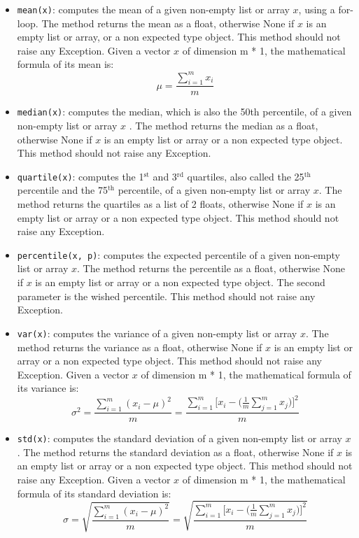 \documentclass{42-en}
\begin{document}
\begin{itemize}
  \item \texttt{mean(x)}: computes the mean of a given non-empty list or array $x$, using a for-loop.
        The method returns the mean as a float, otherwise None if $x$ is an empty list or array,
        or a non expected type object.
        This method should not raise any Exception.
        \newline
        Given a vector $x$ of dimension m * 1, the mathematical formula of its mean is:
        $$
        \mu = \frac{\sum_{i = 1}^{m}{x_i}}{m}
        $$

  \item \texttt{median(x)}: computes the median, which is also the 50th percentile, of a given non-empty list or array $x$ .
        The method returns the median as a float,
        otherwise None if $x$ is an empty list or array or a non expected type object.
        This method should not raise any Exception.

  \item \texttt{quartile(x)}: computes the 1$^\text{st}$ and 3$^\text{rd}$ quartiles,
        also called the 25$^\text{th}$ percentile and the 75$^\text{th}$ percentile, of a given non-empty list or array $x$.
        The method returns the quartiles as a list of 2 floats,
        otherwise None if $x$ is an empty list or array or a non expected type object.
        This method should not raise any Exception.

  \item \texttt{percentile(x, p)}: computes the expected percentile of a given non-empty list or array $x$.
        The method returns the percentile as a float,
        otherwise None if $x$ is an empty list or array or a non expected type object.
        The second parameter is the wished percentile.
        This method should not raise any Exception.

  \item \texttt{var(x)}: computes the variance of a given non-empty list or array $x$.
        The method returns the variance as a float,
        otherwise None if $x$ is an empty list or array or a non expected type object.
        This method should not raise any Exception.
        \newline
        Given a vector $x$ of dimension m * 1, the mathematical formula of its variance is:
        $$
        \sigma^2 = \frac{\sum_{i = 1}^{m}{(x_i - \mu)^2}}{m} = \frac{\sum_{i = 1}^{m}{[x_i - (\frac{1}{m}\sum_{j = 1}^{m}{x_j}})]^2}{m}
        $$

  \item \texttt{std(x)}: computes the standard deviation of a given non-empty list or array $x$.
        The method returns the standard deviation as a float,
        otherwise None if $x$ is an empty list or array or a non expected type object.
        This method should not raise any Exception.
        \newline
        Given a vector $x$ of dimension m * 1, the mathematical formula of its standard deviation is:
        $$
        \sigma = \sqrt{\frac{\sum_{i = 1}^{m}{(x_i - \mu)^2}}{m}} = \sqrt{\frac{\sum_{i = 1}^{m}{[x_i - (\frac{1}{m}\sum_{j = 1}^{m}{x_j}})]^2}{m}}
        $$
\end{itemize}
\end{document}

